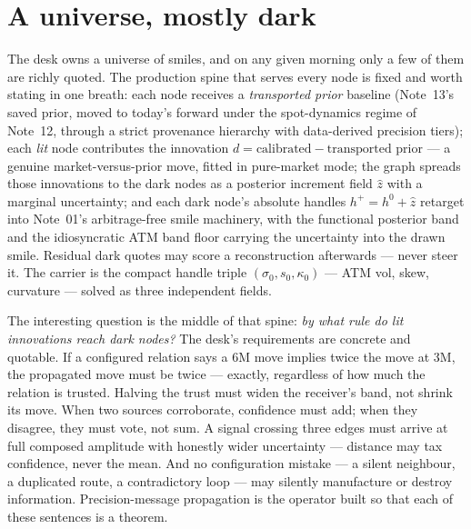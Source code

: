 \documentclass[11pt]{article}
\begin{document}
\newpage
\tableofcontents
\newpage

\section{A universe, mostly dark}
\label{sec:problem}

The desk owns a universe of smiles, and on any given morning only a few
of them are richly quoted.  The production spine that serves every node
is fixed and worth stating in one breath: each node receives a
\emph{transported prior} baseline (Note~13's saved prior, moved to
today's forward under the spot-dynamics regime of Note~12, through a
strict provenance hierarchy with data-derived precision tiers); each
\emph{lit} node contributes the innovation
$d=\text{calibrated}-\text{transported prior}$ --- a genuine
market-versus-prior move, fitted in pure-market mode; the graph spreads
those innovations to the dark nodes as a posterior increment field
$\widehat z$ with a marginal uncertainty; and each dark node's absolute
handles $h^+=h^0+\widehat z$ retarget into Note~01's arbitrage-free
smile machinery, with the functional posterior band and the
idiosyncratic ATM band floor carrying the uncertainty into the drawn
smile.  Residual dark quotes may score a reconstruction afterwards ---
never steer it.  The carrier is the compact handle triple
$(\sigma_0,s_0,\kappa_0)$ --- ATM vol, skew, curvature --- solved as
three independent fields.

The interesting question is the middle of that spine: \emph{by what rule
do lit innovations reach dark nodes?}  The desk's requirements are
concrete and quotable.  If a configured relation says a 6M move implies
twice the move at 3M, the propagated move must be twice --- exactly,
regardless of how much the relation is trusted.  Halving the trust must
widen the receiver's band, not shrink its move.  When two sources
corroborate, confidence must add; when they disagree, they must vote,
not sum.  A signal crossing three edges must arrive at full composed
amplitude with honestly wider uncertainty --- distance may tax
confidence, never the mean.  And no configuration mistake --- a silent
neighbour, a duplicated route, a contradictory loop --- may silently
manufacture or destroy information.  Precision-message propagation is
the operator built so that each of these sentences is a theorem.
\end{document}
